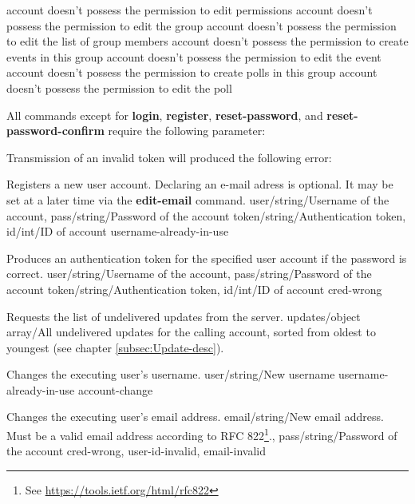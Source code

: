 \documentclass[parskip=full,11pt]{scrartcl}
\begin{document}
{account doesn't possess the permission to edit permissions}
{account doesn't possess the permission to edit the group}
{account doesn't possess the permission to edit the list of group members}
{account doesn't possess the permission to create events in this group}
{account doesn't possess the permission to edit the event}
{account doesn't possess the permission to create polls in this group}
{account doesn't possess the permission to edit the poll}

All commands except for \textbf{login}, \textbf{register},
\textbf{reset-password}, and \textbf{reset-password-confirm} require the
following parameter:\\
\par Transmission of an invalid token will produced the following error:\\

{Registers a new user account.
Declaring an e-mail adress is optional.
It may be set at a later time via the \textbf{edit-email} command.}
{user/string/Username of the account,
pass/string/Password of the account}
{token/string/Authentication token,
id/int/ID of account}
{username-already-in-use}
{}

{Produces an authentication token for the specified user account if the
password is correct.}
{user/string/Username of the account,
pass/string/Password of the account}
{token/string/Authentication token,
id/int/ID of account}
{cred-wrong}
{}

{Requests the list of undelivered updates from the server.}
{}
{updates/object array/All undelivered updates for the calling account{,} sorted
from oldest to youngest (see chapter \ref{subsec:Update-desc}).}
{}
{}

{Changes the executing user's username.}
{user/string/New username}
{}
{username-already-in-use}
{account-change}

{Changes the executing user's email address.}
{email/string/New email address.
Must be a valid email address according to
RFC 822\footnote{See \url{https://tools.ietf.org/html/rfc822}}.,
pass/string/Password of the account}
{}
{cred-wrong, user-id-invalid, email-invalid}
{}
\end{document}
